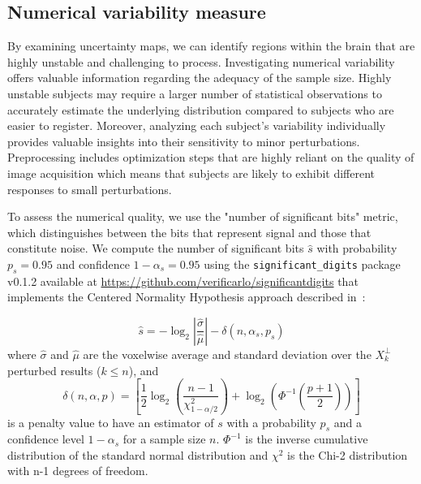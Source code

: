\documentclass{article}
\begin{document}


\subsection{Numerical variability measure}

By examining uncertainty maps, we can identify regions within the brain that are highly unstable and challenging to process. Investigating numerical variability offers valuable information regarding the adequacy of the sample size. Highly unstable subjects may require a larger number of statistical observations to accurately estimate the underlying distribution compared to subjects who are easier to register. Moreover, analyzing each subject's variability individually provides valuable insights into their sensitivity to minor perturbations. Preprocessing includes optimization steps that are highly reliant on the quality of image acquisition which means that subjects are likely to exhibit different responses to small perturbations.

To assess the numerical quality, we use the "number of significant bits" metric, which distinguishes between the bits that represent signal and those that constitute noise. We compute the number of significant bits $\hat{s}$ with probability $p_s=0.95$ and confidence $1-\alpha_s=0.95$ using the \texttt{significant\_digits} package v0.1.2 available at \url{https://github.com/verificarlo/significantdigits} that implements the Centered Normality Hypothesis approach described in~\cite{sohier2021confidence}:

\[
    \hat{s} = -\log_2 \left| \frac{\hat{\sigma}}{\hat{\mu}} \right| - \delta(n, \alpha_s, p_s)
\]
where $\hat{\sigma}$ and $\hat{\mu}$ are the voxelwise average and standard deviation over the $X_k^\perp$ perturbed results ($k \leq n$), and
\[
    \delta(n, \alpha, p) =
    \left[
        \frac{1}{2} \log_2 \left( \frac{n-1}{\chi^2_{1-\alpha/2}} \right) +
        \log_2 \left( \Phi^{-1} \left( \frac{p+1}{2} \right) \right)
        \right]
\]
is a penalty value to have an estimator of $s$ with a probability $p_s$ and a confidence level $1-\alpha_s$ for a sample size $n$. $\Phi^{-1}$ is the inverse cumulative distribution of the standard normal distribution and $\chi^2$ is the Chi-2 distribution with n-1 degrees of freedom.
\end{document}
